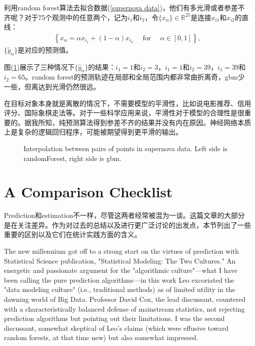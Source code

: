 \documentclass[lang=cn,11pt,a4paper,cite=authoryear]{elegantpaper}
\begin{document}
利用random forest算法去拟合数据(\ref{supernova data})，他们有多光滑或者参差不齐呢？对于75个观测中的任意两个，记为$i_1$和$i_2$，令$\{x_{\alpha}\} \in \mathbb{R}^{25}$是连接$x_{i1}$和$x_{i2}$的直线：
\begin{align}
\left\{x_{\alpha}=\alpha x_{i_{1}}+(1-\alpha) x_{i_{2}} \quad \text { for } \quad \alpha \in[0,1]\right\},
\end{align}
$\{\hat{y}_{\alpha}\}$是对应的预测值。

图(\ref{fig13})展示了三种情况下$\{\hat{y}_{\alpha}\}$的结果：$i_1 = 1$和$i_2 = 3$，$i_1 = 1$和$i_2 = 39$，$i_1 = 39$和$i_2 = 65$。random forest的预测轨迹在局部和全局范围内都非常曲折离奇，gbm少一些，但离达到光滑仍然很远。

在目标对象本身就是离散的情况下，不需要模型的平滑性，比如说电影推荐、信用评分、国际象棋走法等。对于一些科学应用来说，平滑性对于模型的合理性是很重要的。据我所知，纯预测算法得到参差不齐的结果并没有内在原因。神经网络本质上是复杂的逻辑回归程序，可能被期望得到更平滑的输出。

\begin{figure}[H]
		\centering
		\caption{Interpolation between pairs of points in supernova data. Left side is randomForest, right side is gbm.}
		\label{fig13}
\end{figure}

\section{A Comparison Checklist}

Prediction和estimation不一样，尽管这两者经常被混为一谈。这篇文章的大部分是在关注差异。作为对过去的总结以及进行更广泛讨论的出发点，本节列出了一些重要的区别以及它们在统计实践方面的含义。

The new millennium got off to a strong start on the virtues of prediction with \cite{breiman2001statistical} Statistical Science publication, "Statistical Modeling: The Two Cultures." An energetic and passionate argument for the "algorithmic culture"—what I have been calling the pure prediction algorithms—in this work Leo excoriated the "data modeling culture" (i.e., traditional methods) as of limited utility in the dawning world of Big Data. Professor David Cox, the lead discussant, countered with a characteristically balanced defense of mainstream statistics, not rejecting prediction algorithms but pointing out their limitations. I was the second discussant, somewhat skeptical of Leo's claims (which were effusive toward random forests, at that time new) but also somewhat impressed. 
\end{document}
